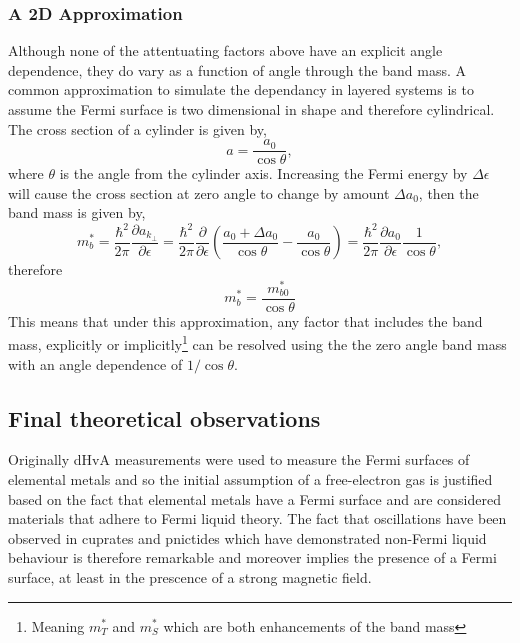 \subsubsection{A 2D Approximation}

Although none of the attentuating factors above have an explicit angle dependence, they do vary as a function of angle through the band mass. A common approximation to simulate the dependancy in layered systems is to assume the Fermi surface is two dimensional in shape and therefore cylindrical. The cross section of a cylinder is given by,
\begin{equation}
    a = \frac{a_0}{\cos \theta},
\end{equation}
where $\theta$ is the angle from the cylinder axis. Increasing the Fermi energy by $\Delta \epsilon$ will cause the cross section at zero angle to change by amount $\Delta a_0$, then the band mass is given by,
\begin{equation}
    m^*_b = \frac{\hbar^2}{2\pi}\frac{\partial a_{k_\perp}}{\partial \epsilon} = \frac{\hbar^2}{2\pi}\frac{\partial}{\partial \epsilon}\left(\frac{a_0 + \Delta a_0 }{\cos\theta} - \frac{a_0 }{\cos\theta}\right) = \frac{\hbar^2}{2\pi}\frac{\partial a_0}{\partial \epsilon}\frac{1}{\cos \theta},
\end{equation}
therefore
\begin{equation}
    m^*_b = \frac{m^*_{b0} }{\cos{\theta}}
\end{equation}
This means that under this approximation, any factor that includes the band mass, explicitly or implicitly\footnote{Meaning $m^*_T$ and $m^*_S$ which are both enhancements of the band mass} can be resolved using the the zero angle band mass with an angle dependence of $1/\cos{\theta}$.

\subsection{Final theoretical observations}

Originally \ac{dHvA} measurements were used to measure the Fermi surfaces of elemental metals and so the initial assumption of a free-electron gas is justified based on the fact that elemental metals have a Fermi surface and are considered materials that adhere to Fermi liquid theory. The fact that oscillations have been observed in cuprates and pnictides which have demonstrated non-Fermi liquid behaviour is therefore remarkable and moreover implies the presence of a Fermi surface, at least in the prescence of a strong magnetic field.

